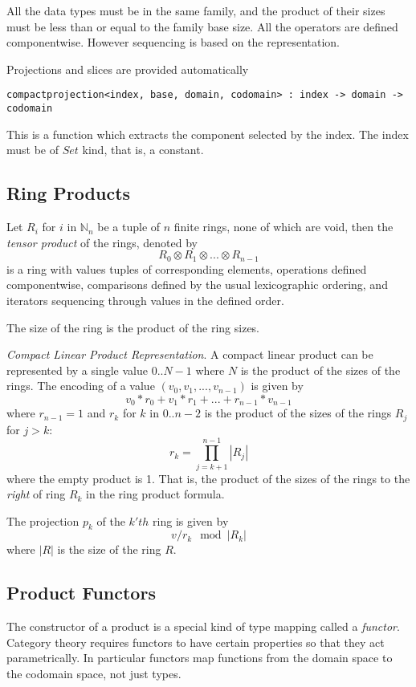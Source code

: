 All the data types must be in the same family, and the product
of their sizes must be less than or equal to the family base size.
All the operators are defined componentwise. However sequencing
is based on the representation.

Projections and slices are provided automatically
\begin{verbatim}
compactprojection<index, base, domain, codomain> : index -> domain -> codomain
\end{verbatim}
This is a function which extracts the component selected
by the index. The index must be of $Set$ kind, that is, a constant.

\subsection{Ring Products}
\begin{definition}
Let $R_i$ for $i$ in $\mathbb{N}_n$ be a tuple of $n$ finite rings, none of which are void,
then the {\em tensor product} of the rings, denoted by
$$R_0 \otimes R_1 \otimes ... \otimes R_{n-1}$$
is a ring with values tuples of corresponding elements, operations
defined componentwise, comparisons defined by the usual lexicographic
ordering, and iterators sequencing through values in the defined order.
\end{definition}
The size of the ring is the product of the ring sizes.

\begin{theorem} {\em Compact Linear Product Representation}.
A compact linear product can be represented by a single value
$0..{N-1}$ where $N$ is the product of the sizes of the rings.
The encoding of a value $(v_0, v_1, ... ,v_{n-1})$ is given by
$$v_0 * r_0 + v_1 * r_1 + ... + r_{n-1} * v_{n-1}$$
where $r_{n-1}=1$ and $r_k$ for $k$ in $0..n-2$ is the product of the sizes of the rings
$R_j$ for $j>k$:
$$r_k = \prod_{j=k+1}^{n-1} |R_j|$$
where the empty product is 1. That is, the product of the sizes of the rings
to the {\em right} of ring $R_k$ in the ring product formula.

The projection $p_k$ of the $k'th$ ring is given by $$v / r_k \mod |R_k|$$
where $|R|$ is the size of the ring $R$.
\end{theorem}

\subsection{Product Functors}
The constructor of a product is a special kind of type mapping called a {\em functor}.
Category theory requires functors to have certain properties so that they
act parametrically. In particular functors map functions from the domain space
to the codomain space, not just types.

